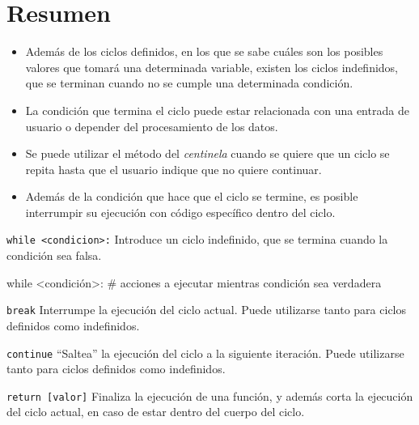 \newpage
\section{Resumen}
\label{ciclos:resumen}

\begin{itemize}

\item Además de los ciclos definidos, en los que se sabe cuáles son los
posibles valores que tomará una determinada variable, existen los ciclos
indefinidos, que se terminan cuando no se cumple una determinada condición.

\item La condición que termina el ciclo puede estar relacionada con una entrada
de usuario o depender del procesamiento de los datos.

\item Se puede utilizar el método del \emph{centinela} cuando se quiere que un ciclo se
repita hasta que el usuario indique que no quiere continuar.

\item Además de la condición que hace que el ciclo se termine, es posible
interrumpir su ejecución con código específico dentro del ciclo.

\end{itemize}

\begin{referencia_python}

\begin{sintaxis}{\lstinline!while <condicion>:!}
Introduce un ciclo indefinido, que se termina cuando la condición sea falsa.
\begin{codigo-python-sn}
while <condición>:
    # acciones a ejecutar mientras condición sea verdadera
\end{codigo-python-sn}
\end{sintaxis}

\begin{sintaxis}{\lstinline!break!}
Interrumpe la ejecución del ciclo actual. Puede utilizarse tanto para ciclos
definidos como indefinidos.
\end{sintaxis}

\begin{sintaxis}{\lstinline!continue!}
``Saltea'' la ejecución del ciclo a la siguiente iteración. Puede utilizarse
tanto para ciclos definidos como indefinidos.
\end{sintaxis}

\begin{sintaxis}{\lstinline!return [valor]!}
Finaliza la ejecución de una función, y además corta la ejecución del ciclo
actual, en caso de estar dentro del cuerpo del ciclo.
\end{sintaxis}
\end{referencia_python}

